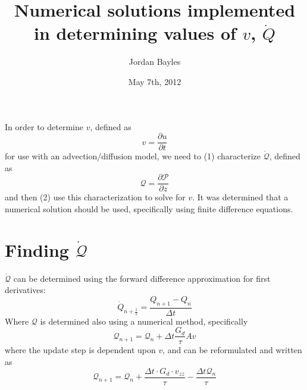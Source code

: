 \documentclass[12pt,letterpaper]{article}
\author{Jordan Bayles}
\date{May 7th, 2012} %
\title{Numerical solutions implemented in determining values of $v$, $\dot{Q}$}
\newcommand{\pd}[2]{\frac{\partial#1}{\partial#2}}
\newcommand{\script}[1]{\mathcal{#1}} %
\begin{document}
\maketitle

\noindent In order to determine $v$, defined as
\begin{equation}
v = \pd{u}{t}
\end{equation}
for use with an advection/diffusion model, we need to (1) characterize
$\dot{\script{Q}}$, defined as
\begin{equation}
\script{Q} = \pd{\script{P}}{z}
\end{equation}
and then (2) use this characterization to solve for $v$. It was determined
that a numerical solution should be used, specifically using finite difference equations.

\section{Finding $\dot{\script{Q}}$}
$\dot{\script{Q}}$
can be determined using the forward difference approximation for first derivatives:
\begin{equation}
\dot{Q}_{n + \frac{1}{2}} = \frac{Q_{n+1} - Q_n}{\Delta t}
\end{equation}
Where $\script{Q}$ is determined also using a numerical method, specifically
\begin{equation}
\script{Q}_{n+1} = \script{Q}_n + \Delta t \frac{G_d}{\tau} Av
\end{equation}
where the update step is dependent upon $v$, and can be reformulated and written as
\begin{equation}
\script{Q}_{n+1} = \script{Q}_n + \frac{\Delta t \cdot G_d \cdot v_{zz}}{\tau} -
\frac{\Delta t \script{Q}_n}{\tau}
\end{equation}

\end{document}
